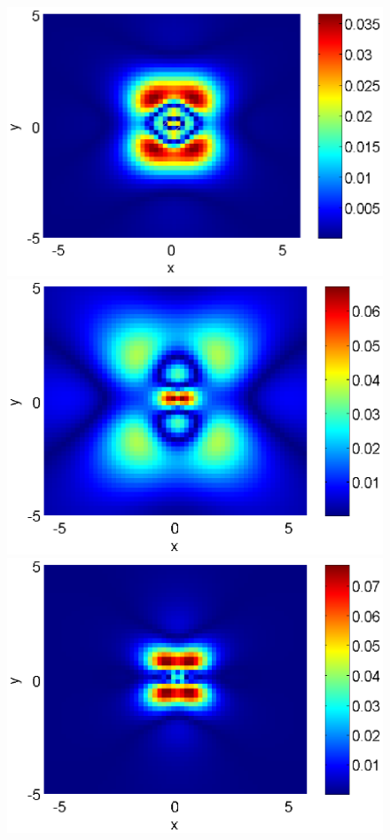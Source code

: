 \documentclass{article}
\begin{document}
\begin{figure}[htbp]
\begin{minipage}[b]{0.48\linewidth}
		 \includegraphics[width=\linewidth]{../EllipticEquationSJC/differences/difference_c=03_beta=3.eps}
	\end{minipage}
	\begin{minipage}[b]{0.48\linewidth}
		\raggedright
		 \includegraphics[width=\linewidth]{../EllipticEquationSJC/differences/difference_c=05_beta=1.eps}
	\end{minipage}
	\begin{minipage}[b]{0.48\linewidth}
		\raggedleft
		 \includegraphics[width=\linewidth]{../EllipticEquationSJC/differences/difference_c=03_beta=5.eps}

\end{minipage}
\end{figure}
\end{document}
